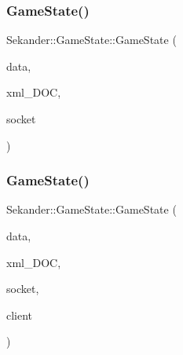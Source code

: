 \mbox{\label{classSekander_1_1GameState_ada3b0410f31b43c596dfbaf729e82546}} 
\subsubsection{\texorpdfstring{Game\+State()}{GameState()}\hspace{0.1cm}{\footnotesize\ttfamily [3/6]}}
{\footnotesize\ttfamily Sekander\+::\+Game\+State\+::\+Game\+State (\begin{DoxyParamCaption}\item[{\hyperlink{namespaceSekander_a1d69b002ba2d23020901c28f0def5e16}{Game\+Data\+Ref}}]{data,  }\item[{const char $\ast$}]{xml\+\_\+\+D\+OC,  }\item[{sf\+::\+Tcp\+Socket $\ast$}]{socket }\end{DoxyParamCaption})}

\mbox{\label{classSekander_1_1GameState_a00cf0995110149d2e86240bd7514b141}} 
\subsubsection{\texorpdfstring{Game\+State()}{GameState()}\hspace{0.1cm}{\footnotesize\ttfamily [4/6]}}
{\footnotesize\ttfamily Sekander\+::\+Game\+State\+::\+Game\+State (\begin{DoxyParamCaption}\item[{\hyperlink{namespaceSekander_a1d69b002ba2d23020901c28f0def5e16}{Game\+Data\+Ref}}]{data,  }\item[{const char $\ast$}]{xml\+\_\+\+D\+OC,  }\item[{sf\+::\+Tcp\+Socket $\ast$}]{socket,  }\item[{sf\+::\+Tcp\+Socket $\ast$}]{client }\end{DoxyParamCaption})}

\mbox{\label{classSekander_1_1GameState_acbb55fb2bbaee0294648eb7ea6ab6193}} 
